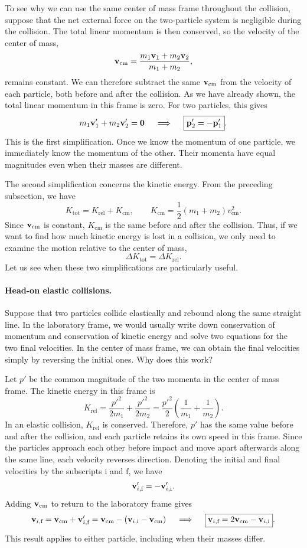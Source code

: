 \documentclass[12pt]{article}
\begin{document}
To see why we can use the same center of mass frame throughout the collision, suppose that the net external force on the two-particle system is negligible during the collision. The total linear momentum is then conserved, so the velocity of the center of mass,
\[
    \vb{v}_{\text{cm}}
    = \frac{m_1\vb{v}_1 + m_2\vb{v}_2}{m_1+m_2},
\]
remains constant. We can therefore subtract the same $\vb{v}_{\text{cm}}$ from the velocity of each particle, both before and after the collision. As we have already shown, the total linear momentum in this frame is zero. For two particles, this gives
\[
    m_1\vb{v}_1' + m_2\vb{v}_2' = \vb{0}
    \quad \implies \quad
    \boxed{\vb{p}_2' = -\vb{p}_1'}.
\]
This is the first simplification. Once we know the momentum of one particle, we immediately know the momentum of the other. Their momenta have equal magnitudes even when their masses are different.

The second simplification concerns the kinetic energy. From the preceding subsection, we have
\[
    K_{\text{tot}} = K_{\text{rel}} + K_{\text{cm}},
    \qquad
    K_{\text{cm}} = \frac{1}{2}(m_1+m_2)v_{\text{cm}}^2.
\]
Since $\vb{v}_{\text{cm}}$ is constant, $K_{\text{cm}}$ is the same before and after the collision. Thus, if we want to find how much kinetic energy is lost in a collision, we only need to examine the motion relative to the center of mass,
\[
    \boxed{\Delta K_{\text{tot}} = \Delta K_{\text{rel}}}.
\]
Let us see when these two simplifications are particularly useful.

\paragraph{Head-on elastic collisions.}
Suppose that two particles collide elastically and rebound along the same straight line. In the laboratory frame, we would usually write down conservation of momentum and conservation of kinetic energy and solve two equations for the two final velocities. In the center of mass frame, we can obtain the final velocities simply by reversing the initial ones. Why does this work?

Let $p'$ be the common magnitude of the two momenta in the center of mass frame. The kinetic energy in this frame is
\[
    K_{\text{rel}}
    = \frac{p'^2}{2m_1} + \frac{p'^2}{2m_2}
    = \frac{p'^2}{2}\left(\frac{1}{m_1}+\frac{1}{m_2}\right).
\]
In an elastic collision, $K_{\text{rel}}$ is conserved. Therefore, $p'$ has the same value before and after the collision, and each particle retains its own speed in this frame. Since the particles approach each other before impact and move apart afterwards along the same line, each velocity reverses direction. Denoting the initial and final velocities by the subscripts $\text{i}$ and $\text{f}$, we have
\[
    \vb{v}_{i,\text{f}}' = -\vb{v}_{i,\text{i}}'.
\]
Adding $\vb{v}_{\text{cm}}$ to return to the laboratory frame gives
\[
    \vb{v}_{i,\text{f}}
    = \vb{v}_{\text{cm}} + \vb{v}_{i,\text{f}}'
    = \vb{v}_{\text{cm}} - (\vb{v}_{i,\text{i}}-\vb{v}_{\text{cm}})
    \quad \implies \quad
    \boxed{\vb{v}_{i,\text{f}} = 2\vb{v}_{\text{cm}}-\vb{v}_{i,\text{i}}}.
\]
This result applies to either particle, including when their masses differ.
\end{document}
